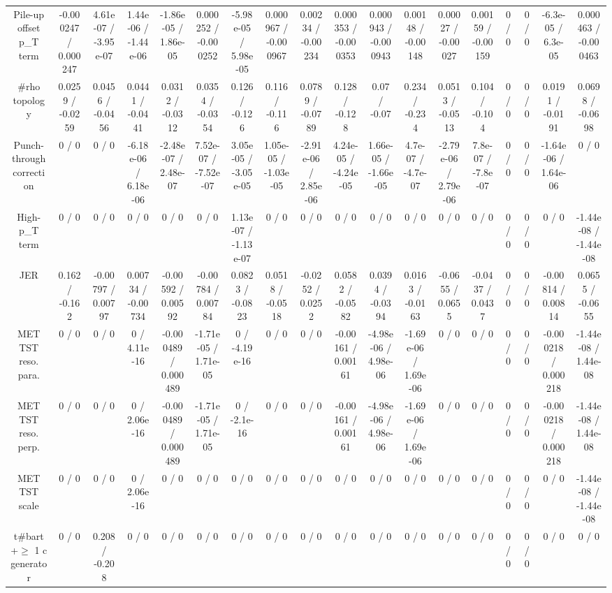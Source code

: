 \documentclass[10pt]{article}
\begin{document}
\begin{table}[htbp]
\begin{center}
\begin{tabular}{|c|c|c|c|c|c|c|c|c|c|c|c|c|c|c|c|c|c|}
  Pile-up offset p_{T} term & -0.000247 / 0.000247 & 4.61e-07 / -3.95e-07 & 1.44e-06 / -1.44e-06 & -1.86e-05 / 1.86e-05 & 0.000252 / -0.000252 & -5.98e-05 / 5.98e-05 & 0.000967 / -0.000967 & 0.00234 / -0.00234 & 0.000353 / -0.000353 & 0.000943 / -0.000943 & 0.00148 / -0.00148 & 0.00027 / -0.00027 & 0.00159 / -0.00159 & 0 / 0 & 0 / 0 & -6.3e-05 / 6.3e-05 & 0.000463 / -0.000463 \\ 
  #rho topology & 0.0259 / -0.0259 & 0.0456 / -0.0456 & 0.0441 / -0.0441 & 0.0312 / -0.0312 & 0.0354 / -0.0354 & 0.126 / -0.126 & 0.116 / -0.116 & 0.0789 / -0.0789 & 0.128 / -0.128 & 0.07 / -0.07 & 0.234 / -0.234 & 0.0513 / -0.0513 & 0.104 / -0.104 & 0 / 0 & 0 / 0 & 0.0191 / -0.0191 & 0.0698 / -0.0698 \\ 
  Punch-through correction & 0 / 0 & 0 / 0 & -6.18e-06 / 6.18e-06 & -2.48e-07 / 2.48e-07 & 7.52e-07 / -7.52e-07 & 3.05e-05 / -3.05e-05 & 1.05e-05 / -1.03e-05 & -2.91e-06 / 2.85e-06 & 4.24e-05 / -4.24e-05 & 1.66e-05 / -1.66e-05 & 4.7e-07 / -4.7e-07 & -2.79e-06 / 2.79e-06 & 7.8e-07 / -7.8e-07 & 0 / 0 & 0 / 0 & -1.64e-06 / 1.64e-06 & 0 / 0 \\ 
  High-p_{T} term & 0 / 0 & 0 / 0 & 0 / 0 & 0 / 0 & 0 / 0 & 1.13e-07 / -1.13e-07 & 0 / 0 & 0 / 0 & 0 / 0 & 0 / 0 & 0 / 0 & 0 / 0 & 0 / 0 & 0 / 0 & 0 / 0 & 0 / 0 & -1.44e-08 / -1.44e-08 \\ 
  JER & 0.162 / -0.162 & -0.00797 / 0.00797 & 0.00734 / -0.00734 & -0.00592 / 0.00592 & -0.00784 / 0.00784 & 0.0823 / -0.0823 & 0.0518 / -0.0518 & -0.0252 / 0.0252 & 0.0582 / -0.0582 & 0.0394 / -0.0394 & 0.0163 / -0.0163 & -0.0655 / 0.0655 & -0.0437 / 0.0437 & 0 / 0 & 0 / 0 & -0.00814 / 0.00814 & 0.0655 / -0.0655 \\ 
  MET TST reso. para. & 0 / 0 & 0 / 0 & 0 / 4.11e-16 & -0.000489 / 0.000489 & -1.71e-05 / 1.71e-05 & 0 / -4.19e-16 & 0 / 0 & 0 / 0 & -0.00161 / 0.00161 & -4.98e-06 / 4.98e-06 & -1.69e-06 / 1.69e-06 & 0 / 0 & 0 / 0 & 0 / 0 & 0 / 0 & -0.000218 / 0.000218 & -1.44e-08 / 1.44e-08 \\ 
  MET TST reso. perp. & 0 / 0 & 0 / 0 & 0 / 2.06e-16 & -0.000489 / 0.000489 & -1.71e-05 / 1.71e-05 & 0 / -2.1e-16 & 0 / 0 & 0 / 0 & -0.00161 / 0.00161 & -4.98e-06 / 4.98e-06 & -1.69e-06 / 1.69e-06 & 0 / 0 & 0 / 0 & 0 / 0 & 0 / 0 & -0.000218 / 0.000218 & -1.44e-08 / 1.44e-08 \\ 
  MET TST scale & 0 / 0 & 0 / 0 & 0 / 2.06e-16 & 0 / 0 & 0 / 0 & 0 / 0 & 0 / 0 & 0 / 0 & 0 / 0 & 0 / 0 & 0 / 0 & 0 / 0 & 0 / 0 & 0 / 0 & 0 / 0 & 0 / 0 & -1.44e-08 / -1.44e-08 \\ 
  t#bar{t}+$\geq$ 1 c generator & 0 / 0 & 0.208 / -0.208 & 0 / 0 & 0 / 0 & 0 / 0 & 0 / 0 & 0 / 0 & 0 / 0 & 0 / 0 & 0 / 0 & 0 / 0 & 0 / 0 & 0 / 0 & 0 / 0 & 0 / 0 & 0 / 0 & 0 / 0 \\ 

\end{tabular}
\end{center}
\end{table}
\end{document}
